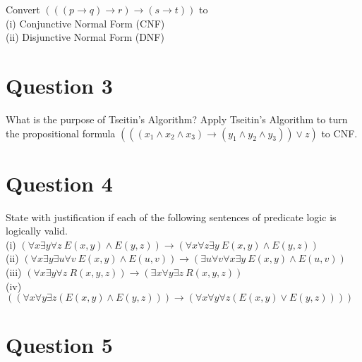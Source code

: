 \documentclass[12pt]{fphw}
\begin{document}
\begin{problem}
  Convert $(((p \to q) \to r) \to (s \to t))$ to \\
  (i) Conjunctive Normal Form (CNF) \\
  (ii) Disjunctive Normal Form (DNF)
\end{problem}

\section*{Question 3}

\begin{problem}
  What is the purpose of Tseitin's Algorithm? Apply Tseitin's Algorithm to turn the propositional formula $(((x_1 \wedge x_2 \wedge x_3) \to (y_1 \wedge y_2 \wedge y_3)) \vee z)$ to CNF.
\end{problem}

\section*{Question 4}

\begin{problem}
  State with justification if each of the following sentences of predicate logic is logically valid. \\
  (i) $(\forall x \exists y \forall z \ E(x,y) \wedge E(y,z)) \to (\forall x \forall z \exists y \ E(x,y) \wedge E(y,z))$ \\
  (ii) $(\forall x \exists y \exists u \forall v \ E(x,y) \wedge E(u,v)) \to (\exists u \forall v \forall x \exists y \ E(x,y) \wedge E(u,v))$ \\
  (iii) $(\forall x \exists y \forall z \ R(x,y,z)) \to (\exists x \forall y \exists z \ R(x,y,z))$ \\
  (iv) $((\forall x \forall y \exists z (E(x,y) \wedge E(y,z))) \to (\forall x \forall y \forall z (E(x,y) \vee E(y,z))))$
\end{problem}

\section*{Question 5}
\end{document}
